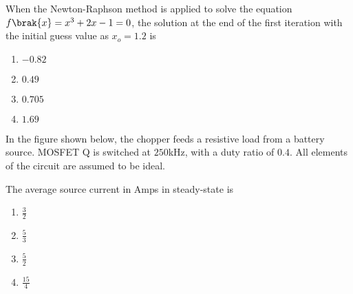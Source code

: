 \item{
When the Newton-Raphson method is applied to solve the equation $f\brak{x}=x^3+2x-1=0$, the solution at the end of the first iteration with the initial guess value as $x_o=1.2$ is
\begin{multicols}{4}
\begin{enumerate}
\item $-0.82$
\item $0.49$
\item $0.705$
\item $1.69$
\end{enumerate}
\end{multicols}
}
\item{
In the figure shown below, the chopper feeds a resistive load from a battery source. MOSFET Q is switched at $250$kHz, with a duty ratio of $0.4$. All elements of the circuit are assumed to be ideal.
\begin{figure}[H]
\centering
{}%

\label{fig:my_label}
\end{figure}
The average source current in Amps in steady-state is
\begin{multicols}{4}
\begin{enumerate}
\item $\frac{3}{2}$
\item $\frac{5}{3}$
\item $\frac{5}{2}$
\item $\frac{15}{4}$
\end{enumerate}
\end{multicols}
}
